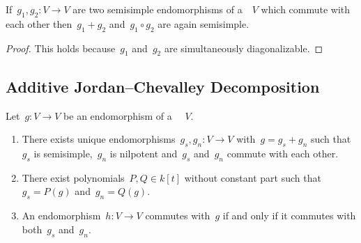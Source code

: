 % 
% 
%   
% 
% 


\begin{lemma}
  \label{combination of ss endomorphisms}
  If~$g_1, g_2 \colon V \to V$ are two semisimple endomorphisms of a~{\kvs}~$V$ which commute with each other then~$g_1 + g_2$ and~$g_1 \circ g_2$ are again semisimple.
\end{lemma}


\begin{proof}
  This holds because~$g_1$ and~$g_2$ are simultaneously diagonalizable.
\end{proof}


\subsection{Additive Jordan--Chevalley Decomposition}

\begin{proposition}
  \label{jcd}
  Let~$g \colon V \to V$ be an endomorphism of a {\fd}~{\kvs}~$V$.
  \begin{enumerate}
    \item
      \label{the jcd itself}
      There exists unique endomorphisms~$g_s, g_n \colon V \to V$ with~$g = g_s + g_n$ such that~$g_s$ is semisimple,~$g_n$ is nilpotent and~$g_s$ and~$g_n$ commute with each other.
    \item
      \label{existence of polynomials}
      There exist polynomials~$P, Q \in k[t]$ without constant part such that~$g_s = P(g)$ and~$g_n = Q(g)$.
    \item
      \label{commuting via jcd}
      An endomorphism~$h \colon V \to V$ commutes with~$g$ if and only if it commutes with both~$g_s$ and~$g_n$.
  \end{enumerate}
\end{proposition}


